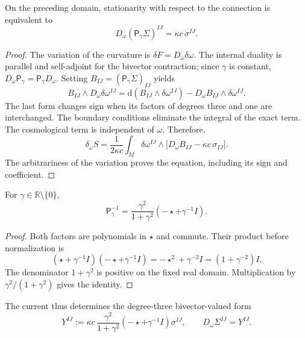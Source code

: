 \begin{HMTCompactSection}
\begin{theorem}
\label{x_reciprocidad:vii:thm:ecuacion-cartan-holst}
On the preceding domain, stationarity with respect to the connection is equivalent to
\begin{equation}
 D_\omega(\mathsf P_\gamma\Sigma)^{IJ}
       =\kappa c\,\sigma^{IJ}.
 \label{x_reciprocidad:vii:eq:ecuacion-cartan-holst}
\end{equation}
\end{theorem}
\begin{proof}
The variation of the curvature is \(\delta F=D_\omega\delta\omega\). The internal duality is parallel and self-adjoint for the bivector contraction; since \(\gamma\) is constant, \(D_\omega\mathsf P_\gamma=\mathsf P_\gamma D_\omega\). Setting \(B_{IJ}=(\mathsf P_\gamma\Sigma)_{IJ}\) yields
\[
 B_{IJ}\wedge D_\omega\delta\omega^{IJ}
 =\mathrm d(B_{IJ}\wedge\delta\omega^{IJ})
   -D_\omega B_{IJ}\wedge\delta\omega^{IJ}.
\]
The last form changes sign when its factors of degrees three and one are interchanged. The boundary conditions eliminate the integral of the exact term. The cosmological term is independent of \(\omega\). Therefore,
\[
 \delta_\omega S=
 \frac1{2\kappa c}\int_M\delta\omega^{IJ}\wedge
       \bigl[D_\omega B_{IJ}-\kappa c\,\sigma_{IJ}\bigr].
\]
The arbitrariness of the variation proves the equation, including its
sign and coefficient.
\end{proof}

\begin{lemma}
\label{x_reciprocidad:vii:lem:inversa-holst}
For \(\gamma\in\mathbb R\setminus\{0\}\),
\begin{equation}
 \mathsf P_\gamma^{-1}
 =\frac{\gamma^2}{1+\gamma^2}
                      (-\star+\gamma^{-1}I).
 \label{x_reciprocidad:vii:eq:inversa-holst}
\end{equation}
\end{lemma}
\begin{proof}
Both factors are polynomials in \(\star\) and commute. Their
product before normalization is
\[
 (\star+\gamma^{-1}I)(-\star+\gamma^{-1}I)
 =-\star^2+\gamma^{-2}I=(1+\gamma^{-2})I.
\]
The denominator \(1+\gamma^2\) is positive on the fixed real domain. Multiplication by \(\gamma^2/(1+\gamma^2)\) gives the identity.
\end{proof}

The current thus determines the degree-three bivector-valued form
\begin{equation}
 Y^{IJ}:=\kappa c\,
   \frac{\gamma^2}{1+\gamma^2}
   (-\star+\gamma^{-1}I)\sigma^{IJ},
 \qquad D_\omega\Sigma^{IJ}=Y^{IJ}.
 \label{x_reciprocidad:vii:eq:corriente-dualizada}
\end{equation}


\end{HMTCompactSection}
